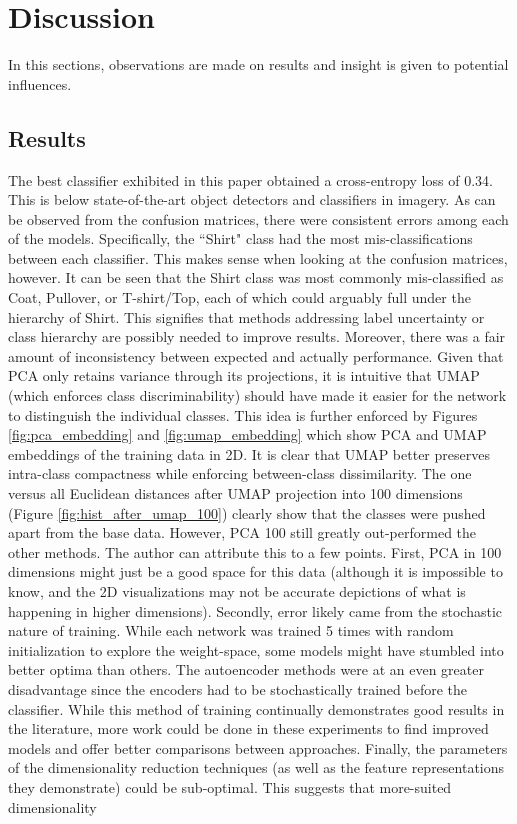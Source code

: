 \documentclass[conference]{IEEEtran}
\begin{document}

\section{Discussion} \label{Discussion}
In this sections, observations are made on results and insight is given to potential influences.

\subsection{Results}
The best classifier exhibited in this paper obtained a cross-entropy loss of 0.34.  This is below state-of-the-art object detectors and classifiers in imagery.  As can be observed from the confusion matrices, there were consistent errors among each of the models.  Specifically, the ``Shirt" class had the most mis-classifications between each classifier.  This makes sense when looking at the confusion matrices, however.  It can be seen that the Shirt class was most commonly mis-classified as Coat, Pullover, or T-shirt/Top, each of which could arguably full under the hierarchy of Shirt.  This signifies that methods addressing label uncertainty or class hierarchy are possibly needed to improve results.  Moreover, there was a fair amount of inconsistency between expected and actually performance.  Given that PCA only retains variance through its projections, it is intuitive that UMAP (which enforces class discriminability) should have made it easier for the network to distinguish the individual classes.  This idea is further enforced by Figures \ref{fig:pca_embedding} and \ref{fig:umap_embedding} which show PCA and UMAP embeddings of the training data in 2D.  It is clear that UMAP better preserves intra-class compactness while enforcing between-class dissimilarity.  The one versus all Euclidean distances after UMAP projection into 100 dimensions (Figure \ref{fig:hist_after_umap_100}) clearly show that the classes were pushed apart from the base data.  However, PCA 100 still greatly out-performed the other methods.  The author can attribute this to a few points.  First, PCA in 100 dimensions might just be a good space for this data (although it is impossible to know, and the 2D visualizations may not be accurate depictions of what is happening in higher dimensions).  Secondly, error likely came from the stochastic nature of training.  While each network was trained 5 times with random initialization to explore the weight-space, some models might have stumbled into better optima than others.  The autoencoder methods were at an even greater disadvantage since the encoders had to be stochastically trained before the classifier.  While this method of training continually demonstrates good results in the literature, more work could be done in these experiments to find improved models and offer better comparisons between approaches. Finally, the parameters of the dimensionality reduction techniques (as well as the feature representations they demonstrate) could be sub-optimal.  This suggests that more-suited dimensionality 
\end{document}
